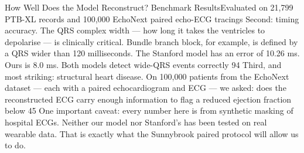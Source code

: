 \documentclass[aspectratio=169,10pt]{beamer}
\begin{document}
\begin{frame}{How Well Does the Model Reconstruct? Benchmark Results}{Evaluated on 21,799 PTB-XL records and 100,000 EchoNext paired echo-ECG tracings}
{  Second: timing accuracy. The QRS complex width — how long it takes the ventricles to depolarise — is clinically critical. Bundle branch block, for example, is defined by a QRS wider than 120 milliseconds. The Stanford model has an error of 10.26 ms. Ours is 8.0 ms. Both models detect wide-QRS events correctly 94%
  Third, and most striking: structural heart disease. On 100,000 patients from the EchoNext dataset — each with a paired echocardiogram and ECG — we asked: does the reconstructed ECG carry enough information to flag a reduced ejection fraction below 45%
  One important caveat: every number here is from synthetic masking of hospital ECGs. Neither our model nor Stanford's has been tested on real wearable data. That is exactly what the Sunnybrook paired protocol will allow us to do.
}
\end{frame}
\end{document}
